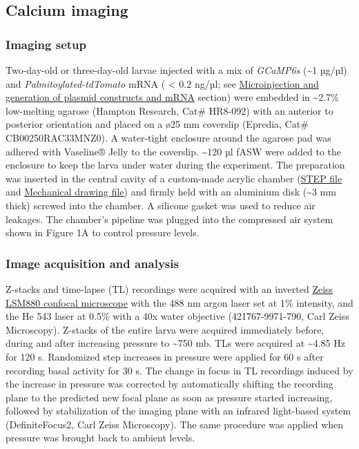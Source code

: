 \documentclass[
  11pt,
]{article}
\begin{document}
\subsection{Calcium imaging}\label{calcium-imaging}

\subsubsection{Imaging setup}\label{imaging-setup}

Two-day-old or three-day-old larvae injected with a mix of
\emph{GCaMP6s} (\textasciitilde1 µg/µl) and
\emph{Palmitoylated-tdTomato} mRNA ( \textless{} 0.2 ng/µl; see
\hyperref[microinjection-and-generation-of-plasmid-constructs-and-mrna]{Microinjection
and generation of plasmid constructs and mRNA} section) were embedded in
\textasciitilde2.7\% low-melting agarose (Hampton Research, Cat\#
HR8-092) with an anterior to posterior orientation and placed on a ø25
mm coverslip (Epredia, Cat\# CB00250RAC33MNZ0). A water-tight enclosure
around the agarose pad was adhered with Vaseline® Jelly to the
coverslip. \textasciitilde120 µl fASW were added to the enclosure to
keep the larva under water during the experiment. The preparation was
inserted in the central cavity of a custom-made acrylic chamber
(\href{https://github.com/JekelyLab/Bezares_et_al_2023_Pressure/blob/main/Data/Mechanical_drawings/Microscopy_pressure_chamber.step}{STEP
file} and
\href{https://github.com/JekelyLab/Bezares_et_al_2023_Pressure/blob/main/Data/Mechanical_drawings/Microscopy_pressure_chamber.pdf}{Mechanical
drawing file}) and firmly held with an aluminium disk (\textasciitilde3
mm thick) screwed into the chamber. A silicone gasket was used to reduce
air leakages. The chamber's pipeline was plugged into the compressed air
system shown in Figure 1A to control pressure levels.

\subsubsection{Image acquisition and
analysis}\label{image-acquisition-and-analysis}

Z-stacks and time-lapse (TL) recordings were acquired with an inverted
\href{http://biosciences.exeter.ac.uk/bioimaging/equipment/light/zeisslsm880airyscan/}{Zeiss
LSM880 confocal microscope} with the 488 nm argon laser set at 1\%
intensity, and the He 543 laser at 0.5\% with a 40x water objective
(421767-9971-790, Carl Zeiss Microscopy). Z-stacks of the entire larva
were acquired immediately before, during and after increasing pressure
to \textasciitilde750 mb. TLs were acquired at \textasciitilde4.85 Hz
for 120 s. Randomized step increases in pressure were applied for 60 s
after recording basal activity for 30 s. The change in focus in TL
recordings induced by the increase in pressure was corrected by
automatically shifting the recording plane to the predicted new focal
plane as soon as pressure started increasing, followed by stabilization
of the imaging plane with an infrared light-based system
(DefiniteFocus2, Carl Zeiss Microscopy). The same procedure was applied
when pressure was brought back to ambient levels.
\end{document}
